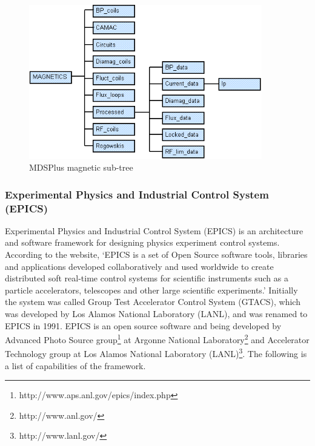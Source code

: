 \begin{figure}[h]
\begin{center}
\includegraphics[width=4in]{figures/Tree-example.png}
\caption{MDSPlus magnetic sub-tree\label{tree-example}}
\end{center}
\end{figure}

\subsubsection{Experimental Physics and Industrial Control System (EPICS)}\label{sec-epics}

Experimental Physics and Industrial Control System (EPICS)\cite{website:epics} is an architecture and software framework for designing physics experiment control systems. According to the website, `EPICS is a set of Open Source software tools, libraries and applications developed collaboratively and used worldwide to create distributed soft real-time control systems for scientific instruments such as a particle accelerators, telescopes and other large scientific experiments.' Initially the system was called Group Test Accelerator Control System (GTACS), which was developed by Los Alamos National Laboratory (LANL), and was renamed to EPICS in 1991. EPICS is an open source software and being developed by Advanced Photo Source group\footnote{http://www.aps.anl.gov/epics/index.php} at Argonne National Laboratory\footnote{http://www.anl.gov/} and Accelerator Technology group at Los Alamos National Laboratory (LANL)\footnote{http://www.lanl.gov/}\cite{lecture:johnson_intro_to_epics,dalesio1991epics}. The following is a list of capabilities of the framework\cite{lecture:johnson_intro_to_epics}.

